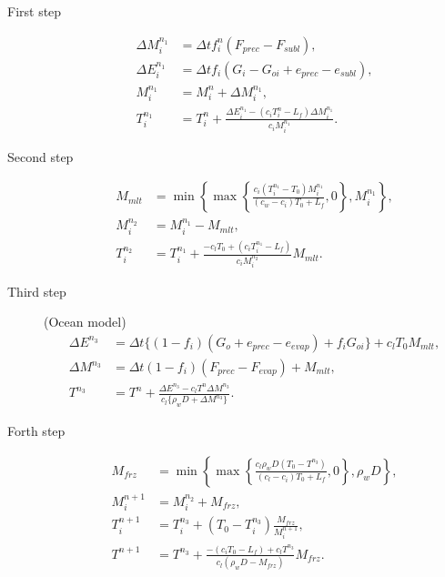 \begin{description}

\item[First step]
\begin{align}
 \Delta M_i^{n_1} &= \Delta t f_i^n ( F_{prec} - F_{subl} ), \\
 \Delta E_i^{n_1} &= \Delta t f_i ( G_i - G_{oi} + e_{prec} - e_{subl} ), \\
 M_i^{n_1} &= M_i^n + \Delta M_i^{n_1}, \\
 T_i^{n_1} &= T_i^n + \frac{ \Delta E_i^{n_1} - ( c_iT_i^n - L_f ) \Delta M_i^{n_1} }{c_i M_i^{n_1}}.
\end{align}

\item[Second step]
\begin{align}
 M_{mlt} &= \min\left\{ \max\left\{ \frac{ c_i(T_i^{n_1}-T_0)M_i^{n_1} }{ (c_w-c_i) T_0 + L_f }, 0\right\}, M_i^{n_1}\right\}, \\
 M_i^{n_2} &= M_i^{n_1} - M_{mlt}, \\
 T_i^{n_2} &= T_i^{n_1} + \frac{ - c_l T_0  + ( c_iT_i^{n_1} - L_f )}{c_i M_i^{n_2}}M_{mlt}.
\end{align}

\item[Third step] (Ocean model)
\begin{align}
 \Delta E^{n_3} &= \Delta t \{ (1-f_i)(G_o + e_{prec} - e_{evap}) + f_i G_{oi} \} + c_l T_0 M_{mlt}, \\
 \Delta M^{n_3} &= \Delta t (1-f_i)(F_{prec}-F_{evap}) + M_{mlt}, \\
 T^{n_3} &= T^n + \frac{ \Delta E^{n_3} - c_l T^n \Delta M^{n_3} }{c_l \{\rho_w D + \Delta M^{n_3} \}}.
\end{align}

\item[Forth step]
\begin{align}
 M_{frz} &= \min\left\{ \max\left\{ \frac{ c_l \rho_w D ( T_0 - T^{n_3} ) }{ (c_l - c_i)T_0 + L_f }, 0\right\}, \rho_w D\right\}, \\
 M_i^{n+1} &= M_i^{n_2} + M_{frz}, \\
 T_i^{n+1} &= T_i^{n_3} + ( T_0 - T_i^{n_3} ) \frac{M_{frz}}{M_i^{n+1}}, \\
 T^{n+1} &= T^{n_3} + \frac{ - ( c_i T_0 - L_f ) + c_l T^{n_3} }{c_l (\rho_w D - M_{frz}) } M_{frz}.
\end{align}

\end{description}

